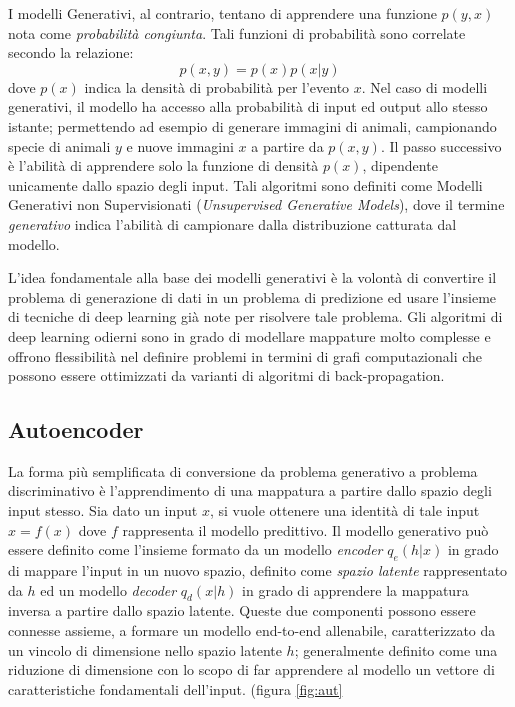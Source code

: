 I modelli Generativi, al contrario, tentano di apprendere una funzione $p(y,x)$ nota come \textit{probabilità congiunta}. Tali funzioni di probabilità sono correlate secondo la relazione: 
\[p(x,y)=p(x)p(x|y)\]
dove $p(x)$ indica la densità di probabilità per l'evento $x$. 
Nel caso di modelli generativi, il modello ha accesso alla probabilità di input ed output allo stesso istante; permettendo ad esempio di generare immagini di animali, campionando specie di animali $y$ e nuove immagini $x$ a partire da $p(x,y)$.
Il passo successivo è l'abilità di apprendere solo la funzione di densità $p(x)$, dipendente unicamente dallo spazio degli input. Tali algoritmi sono definiti come Modelli Generativi non Supervisionati (\textit{Unsupervised Generative Models}), dove il termine \textit{generativo} indica l'abilità di campionare dalla distribuzione catturata dal modello. 

L'idea fondamentale alla base dei modelli generativi è la volontà di convertire il problema di generazione di dati in un problema di predizione ed usare l'insieme di tecniche di deep learning già note per risolvere tale problema. Gli algoritmi di deep learning odierni sono in grado di modellare mappature molto complesse e offrono flessibilità nel definire problemi in termini di grafi computazionali che possono essere ottimizzati da varianti di algoritmi di back-propagation.

\subsection{Autoencoder}
La forma più semplificata di conversione da problema generativo a problema discriminativo è l'apprendimento di una mappatura a partire dallo spazio degli input stesso. Sia dato un input $x$, si vuole ottenere una identità di tale input $x=f(x)$ dove $f$ rappresenta il modello predittivo. Il modello generativo può essere definito come l'insieme formato da un modello \textit{encoder} $q_e(h|x)$ in grado di mappare l'input in un nuovo spazio, definito come \textit{spazio latente} rappresentato da $h$ ed un modello \textit{decoder} $q_d(x|h)$ in grado di apprendere la mappatura inversa a partire dallo spazio latente.
Queste due componenti possono essere connesse assieme, a formare un modello end-to-end allenabile, caratterizzato da un vincolo di dimensione nello spazio latente $h$; generalmente definito come una riduzione di dimensione con lo scopo di far apprendere al modello un vettore di caratteristiche fondamentali dell'input. (figura \ref{fig:aut}


